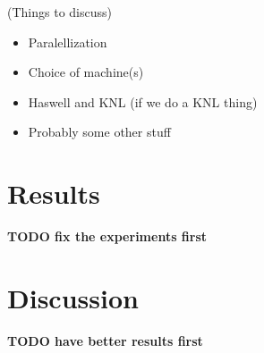 \documentclass[12pt]{article}
\begin{document}
(Things to discuss)
\begin{itemize}
\item Paralellization
\item Choice of machine(s)
\item Haswell and KNL (if we do a KNL thing)
\item Probably some other stuff
\end{itemize}

\section{Results}
\textbf{TODO fix the experiments first}

\section{Discussion}
\textbf{TODO have better results first}

\printbibliography{}
\end{document}
